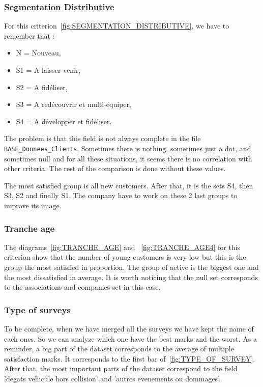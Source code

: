 \documentclass[a4paper, 11pt]{article}
\newcommand{\tw}[1]{\texttt{#1}}
\begin{document}
    \subsubsection{Segmentation Distributive}
    For this criterion~\ref{fig:SEGMENTATION_DISTRIBUTIVE}, we have to remember that :
    \begin{itemize}
    \item N = Nouveau,
    \item S1 = A laisser venir,
    \item S2 = A fidéliser,
    \item S3 = A redécouvrir et multi-équiper,
    \item S4 = A développer et fidéliser.
    \end{itemize}
    The problem is that this field is not always complete in the file \tw{BASE\_Donnees\_Clients}. Sometimes there is nothing, sometimes just a dot, and sometimes null and for all these situations, it seems there is no correlation with other criteria. The rest of the comparison is done without these values.
    
    The most satisfied group is all new customers. After that, it is the sets S4, then S3, S2 and finally S1. The company have to work on these 2 last groups to improve its image.
    
    \subsubsection{Tranche age}
    The diagrams~\ref{fig:TRANCHE_AGE} and ~\ref{fig:TRANCHE_AGE4} for this criterion show that the number of young customers is very low but this is the group the most satisfied in proportion. The group of active is the biggest one and the most dissatisfied in average. It is worth noticing that the null set corresponds to the associations and companies set in this case.
    
    \subsubsection{Type of surveys}
    To be complete, when we have merged all the surveys we have kept the name of each ones. So we can analyze which one have the best marks and the worst. As a reminder, a big part of the dataset corresponds to the average of multiple satisfaction marks. It corresponds to the first bar of~\ref{fig:TYPE_OF_SURVEY}. After that, the most important parts of the dataset correspond to the field 'degats vehicule hors collision' and 'autres evenements ou dommages'.
    
\end{document}
